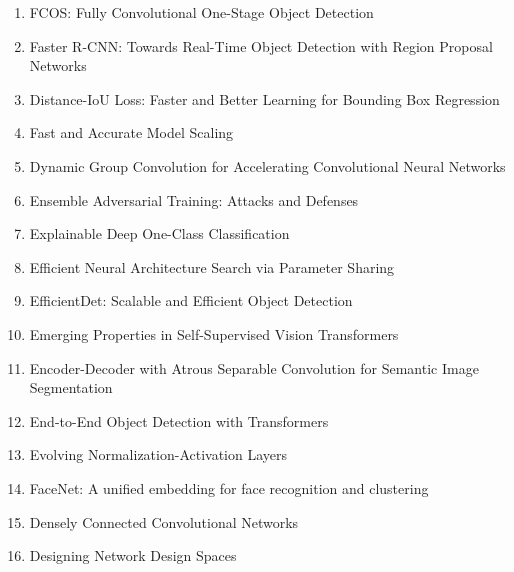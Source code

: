 \documentclass[acmlarge]{acmart}
\begin{document}
\begin{enumerate}
	\item FCOS: Fully Convolutional One-Stage Object Detection \cite{Tian2019FCOSFC} 

	\item Faster R-CNN: Towards Real-Time Object Detection with Region Proposal Networks \cite{Ren2015FasterRT} 

	\item Distance-IoU Loss: Faster and Better Learning for Bounding Box Regression \cite{Zheng2020DistanceIoULF} 

	\item Fast and Accurate Model Scaling \cite{Dollr2021FastAA} 

	\item Dynamic Group Convolution for Accelerating Convolutional Neural Networks \cite{Su2020DynamicGC} 

	\item Ensemble Adversarial Training: Attacks and Defenses \cite{Tramr2018EnsembleAT} 

	\item Explainable Deep One-Class Classification \cite{Liznerski2021ExplainableDO} 

	\item Efficient Neural Architecture Search via Parameter Sharing \cite{Pham2018EfficientNA} 

	\item EfficientDet: Scalable and Efficient Object Detection \cite{Tan2020EfficientDetSA} 

	\item Emerging Properties in Self-Supervised Vision Transformers \cite{Caron2021EmergingPI} 

	\item Encoder-Decoder with Atrous Separable Convolution for Semantic Image Segmentation \cite{Chen2018EncoderDecoderWA} 

	\item End-to-End Object Detection with Transformers \cite{Carion2020EndtoEndOD} 

	\item Evolving Normalization-Activation Layers \cite{Liu2020EvolvingNL} 

	\item FaceNet: A unified embedding for face recognition and clustering \cite{Schroff2015FaceNetAU} 

	\item Densely Connected Convolutional Networks \cite{Huang2017DenselyCC} 

	\item Designing Network Design Spaces \cite{Radosavovic2020DesigningND} 


\end{enumerate}
\end{document}
